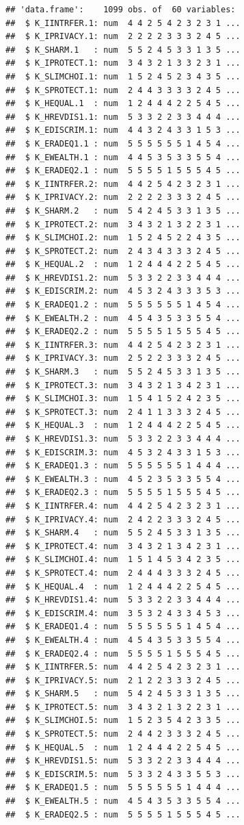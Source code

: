 \documentclass[
]{article}
\begin{document}
\begin{verbatim}
## 'data.frame':    1099 obs. of  60 variables:
##  $ K_IINTRFER.1: num  4 4 2 5 4 2 3 2 3 1 ...
##  $ K_IPRIVACY.1: num  2 2 2 2 3 3 3 2 4 5 ...
##  $ K_SHARM.1   : num  5 5 2 4 5 3 3 1 3 5 ...
##  $ K_IPROTECT.1: num  3 4 3 2 1 3 3 2 3 1 ...
##  $ K_SLIMCHOI.1: num  1 5 2 4 5 2 3 4 3 5 ...
##  $ K_SPROTECT.1: num  2 4 4 3 3 3 3 2 4 5 ...
##  $ K_HEQUAL.1  : num  1 2 4 4 4 2 2 5 4 5 ...
##  $ K_HREVDIS1.1: num  5 3 3 2 2 3 3 4 4 4 ...
##  $ K_EDISCRIM.1: num  4 4 3 2 4 3 3 1 5 3 ...
##  $ K_ERADEQ1.1 : num  5 5 5 5 5 5 1 4 5 4 ...
##  $ K_EWEALTH.1 : num  4 4 5 3 5 3 3 5 5 4 ...
##  $ K_ERADEQ2.1 : num  5 5 5 5 1 5 5 5 4 5 ...
##  $ K_IINTRFER.2: num  4 4 2 5 4 2 3 2 3 1 ...
##  $ K_IPRIVACY.2: num  2 2 2 2 3 3 3 2 4 5 ...
##  $ K_SHARM.2   : num  5 4 2 4 5 3 3 1 3 5 ...
##  $ K_IPROTECT.2: num  3 4 3 2 1 3 2 2 3 1 ...
##  $ K_SLIMCHOI.2: num  1 5 2 4 5 2 2 4 3 5 ...
##  $ K_SPROTECT.2: num  2 4 3 4 3 3 3 2 4 5 ...
##  $ K_HEQUAL.2  : num  1 2 4 4 4 2 2 5 4 5 ...
##  $ K_HREVDIS1.2: num  5 3 3 2 2 3 3 4 4 4 ...
##  $ K_EDISCRIM.2: num  4 5 3 2 4 3 3 3 5 3 ...
##  $ K_ERADEQ1.2 : num  5 5 5 5 5 5 1 4 5 4 ...
##  $ K_EWEALTH.2 : num  4 5 4 3 5 3 3 5 5 4 ...
##  $ K_ERADEQ2.2 : num  5 5 5 5 1 5 5 5 4 5 ...
##  $ K_IINTRFER.3: num  4 4 2 5 4 2 3 2 3 1 ...
##  $ K_IPRIVACY.3: num  2 5 2 2 3 3 3 2 4 5 ...
##  $ K_SHARM.3   : num  5 5 2 4 5 3 3 1 3 5 ...
##  $ K_IPROTECT.3: num  3 4 3 2 1 3 4 2 3 1 ...
##  $ K_SLIMCHOI.3: num  1 5 4 1 5 2 4 2 3 5 ...
##  $ K_SPROTECT.3: num  2 4 1 1 3 3 3 2 4 5 ...
##  $ K_HEQUAL.3  : num  1 2 4 4 4 2 2 5 4 5 ...
##  $ K_HREVDIS1.3: num  5 3 3 2 2 3 3 4 4 4 ...
##  $ K_EDISCRIM.3: num  4 5 3 2 4 3 3 1 5 3 ...
##  $ K_ERADEQ1.3 : num  5 5 5 5 5 5 1 4 4 4 ...
##  $ K_EWEALTH.3 : num  4 5 2 3 5 3 3 5 5 4 ...
##  $ K_ERADEQ2.3 : num  5 5 5 5 1 5 5 5 4 5 ...
##  $ K_IINTRFER.4: num  4 4 2 5 4 2 3 2 3 1 ...
##  $ K_IPRIVACY.4: num  2 4 2 2 3 3 3 2 4 5 ...
##  $ K_SHARM.4   : num  5 5 2 4 5 3 3 1 3 5 ...
##  $ K_IPROTECT.4: num  3 4 3 2 1 3 4 2 3 1 ...
##  $ K_SLIMCHOI.4: num  1 5 1 4 5 3 4 2 3 5 ...
##  $ K_SPROTECT.4: num  2 4 4 4 3 3 3 2 4 5 ...
##  $ K_HEQUAL.4  : num  1 2 4 4 4 2 2 5 4 5 ...
##  $ K_HREVDIS1.4: num  5 3 3 2 2 3 3 4 4 4 ...
##  $ K_EDISCRIM.4: num  3 5 3 2 4 3 3 4 5 3 ...
##  $ K_ERADEQ1.4 : num  5 5 5 5 5 5 1 4 5 4 ...
##  $ K_EWEALTH.4 : num  4 5 4 3 5 3 3 5 5 4 ...
##  $ K_ERADEQ2.4 : num  5 5 5 5 1 5 5 5 4 5 ...
##  $ K_IINTRFER.5: num  4 4 2 5 4 2 3 2 3 1 ...
##  $ K_IPRIVACY.5: num  2 1 2 2 3 3 3 2 4 5 ...
##  $ K_SHARM.5   : num  5 4 2 4 5 3 3 1 3 5 ...
##  $ K_IPROTECT.5: num  3 4 3 2 1 3 2 2 3 1 ...
##  $ K_SLIMCHOI.5: num  1 5 2 3 5 4 2 3 3 5 ...
##  $ K_SPROTECT.5: num  2 4 4 2 3 3 3 2 4 5 ...
##  $ K_HEQUAL.5  : num  1 2 4 4 4 2 2 5 4 5 ...
##  $ K_HREVDIS1.5: num  5 3 3 2 2 3 3 4 4 4 ...
##  $ K_EDISCRIM.5: num  5 3 3 2 4 3 3 5 5 3 ...
##  $ K_ERADEQ1.5 : num  5 5 5 5 5 5 1 4 4 4 ...
##  $ K_EWEALTH.5 : num  4 5 4 3 5 3 3 5 5 4 ...
##  $ K_ERADEQ2.5 : num  5 5 5 5 1 5 5 5 4 5 ...
\end{verbatim}
\end{document}
